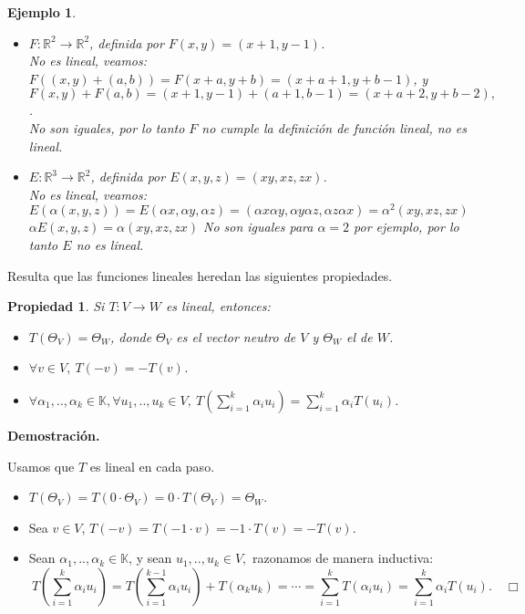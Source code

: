 \documentclass[12pt]{book}
\newtheorem{prop}{Propiedad}
\newtheorem{ejem}{Ejemplo}
\def\R{\mathbb{R}}
\def\K{\mathbb{K}}
\begin{document}
\begin{ejem}
\begin{itemize}
\item $F:\R^2\rightarrow\R^2$, definida por $F(x,y)=(x+1,y-1)$.\\
No es lineal, veamos:\\
$F((x,y)+(a,b))=F(x+a,y+b)=(x+a+1,y+b-1)$, y\\
$F(x,y)+F(a,b)=(x+1,y-1)+(a+1,b-1)=(x+a+2,y+b-2),$.\\
No son iguales, por lo tanto $F$ no cumple la definición de función lineal, no es lineal.
\item $E:\R^3\rightarrow\R^2$, definida por $E(x,y,z)=(xy,xz,zx)$.\\
No es lineal, veamos:\\
$E(\alpha(x,y,z))=E(\alpha x,\alpha y,\alpha z)=(\alpha x\alpha y,\alpha y\alpha z,\alpha z\alpha x)=\alpha^2(xy,xz,zx)$\\
$\alpha E(x,y,z)=\alpha(xy,xz,zx)$
No son iguales para $\alpha=2$ por ejemplo, por lo tanto $E$ no  es lineal.
\end{itemize}
\end{ejem}


Resulta que las funciones lineales heredan las siguientes propiedades.

\begin{prop}\label{teo:basic}
  Si $T:V\rightarrow W$ es lineal, entonces:
\begin{itemize}
\item $T(\Theta_V)=\Theta_W$, donde $\Theta_V$ es el vector neutro de $V$ y $\Theta_W$ el de $W$.
\item $\forall v\in V,\ T(-v)=-T(v)$.
\item $\forall \alpha_1,..,\alpha_k\in \K, \forall u_1,..,u_k\in V,\ {\displaystyle T\left(\sum_{i=1}^k \alpha_i u_i\right)=\sum_{i=1}^k \alpha_i T(u_i)}$.
\end{itemize}
\end{prop}

\newpage


{\bf Demostración.} {\small Usamos que $T$ es lineal en cada paso.
\begin{itemize}
\item $T(\Theta_V)=T(0\cdot \Theta_V)=0\cdot T(\Theta_V)=\Theta_W$.
\item Sea $v\in V$, $T(-v)=T(-1\cdot v)=-1\cdot T(v)=-T(v)$.
\item Sean $\alpha_1,..,\alpha_k\in \K$, y sean $u_1,..,u_k\in V,$ razonamos de manera inductiva:
$$\ {\displaystyle T\left(\sum_{i=1}^k \alpha_i u_i\right)=
T\left(\sum_{i=1}^{k-1} \alpha_i u_i\right)+T(\alpha_ku_k)=\cdots=
\sum_{i=1}^k T(\alpha_i u_i)=
\sum_{i=1}^k \alpha_i T(u_i)}.\quad\Box$$
\end{itemize}
}
\end{document}
